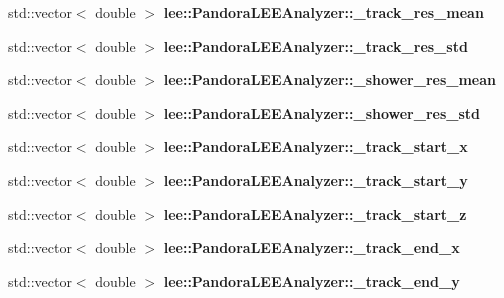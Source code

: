 \begin{DoxyCompactItemize}
\item 
\hypertarget{group__lee_gac8415acd9fe624379b1af65fe523a613}{std\-::vector$<$ double $>$ {\bfseries lee\-::\-Pandora\-L\-E\-E\-Analyzer\-::\-\_\-track\-\_\-res\-\_\-mean}}\label{group__lee_gac8415acd9fe624379b1af65fe523a613}

\item 
\hypertarget{group__lee_gacb00c39c2b71bd7fac4a3c7c6733d514}{std\-::vector$<$ double $>$ {\bfseries lee\-::\-Pandora\-L\-E\-E\-Analyzer\-::\-\_\-track\-\_\-res\-\_\-std}}\label{group__lee_gacb00c39c2b71bd7fac4a3c7c6733d514}

\item 
\hypertarget{group__lee_ga9992152dfa9af10448ef0751007d0c3a}{std\-::vector$<$ double $>$ {\bfseries lee\-::\-Pandora\-L\-E\-E\-Analyzer\-::\-\_\-shower\-\_\-res\-\_\-mean}}\label{group__lee_ga9992152dfa9af10448ef0751007d0c3a}

\item 
\hypertarget{group__lee_ga3a0c057fc83d09918ac2aa805d5bf3c7}{std\-::vector$<$ double $>$ {\bfseries lee\-::\-Pandora\-L\-E\-E\-Analyzer\-::\-\_\-shower\-\_\-res\-\_\-std}}\label{group__lee_ga3a0c057fc83d09918ac2aa805d5bf3c7}

\item 
\hypertarget{group__lee_ga1a0667bd934f598a41bb776e028270f4}{std\-::vector$<$ double $>$ {\bfseries lee\-::\-Pandora\-L\-E\-E\-Analyzer\-::\-\_\-track\-\_\-start\-\_\-x}}\label{group__lee_ga1a0667bd934f598a41bb776e028270f4}

\item 
\hypertarget{group__lee_ga55a26b4d446ea4597e44b2fc22de4cc6}{std\-::vector$<$ double $>$ {\bfseries lee\-::\-Pandora\-L\-E\-E\-Analyzer\-::\-\_\-track\-\_\-start\-\_\-y}}\label{group__lee_ga55a26b4d446ea4597e44b2fc22de4cc6}

\item 
\hypertarget{group__lee_ga71d7b5e5347441a36d0a33710d6c4483}{std\-::vector$<$ double $>$ {\bfseries lee\-::\-Pandora\-L\-E\-E\-Analyzer\-::\-\_\-track\-\_\-start\-\_\-z}}\label{group__lee_ga71d7b5e5347441a36d0a33710d6c4483}

\item 
\hypertarget{group__lee_ga78cb36dded5326c08cae77d5af6f3cd2}{std\-::vector$<$ double $>$ {\bfseries lee\-::\-Pandora\-L\-E\-E\-Analyzer\-::\-\_\-track\-\_\-end\-\_\-x}}\label{group__lee_ga78cb36dded5326c08cae77d5af6f3cd2}

\item 
\hypertarget{group__lee_ga55174718268fd53d080c224f60f96488}{std\-::vector$<$ double $>$ {\bfseries lee\-::\-Pandora\-L\-E\-E\-Analyzer\-::\-\_\-track\-\_\-end\-\_\-y}}\label{group__lee_ga55174718268fd53d080c224f60f96488}


\end{DoxyCompactItemize}
